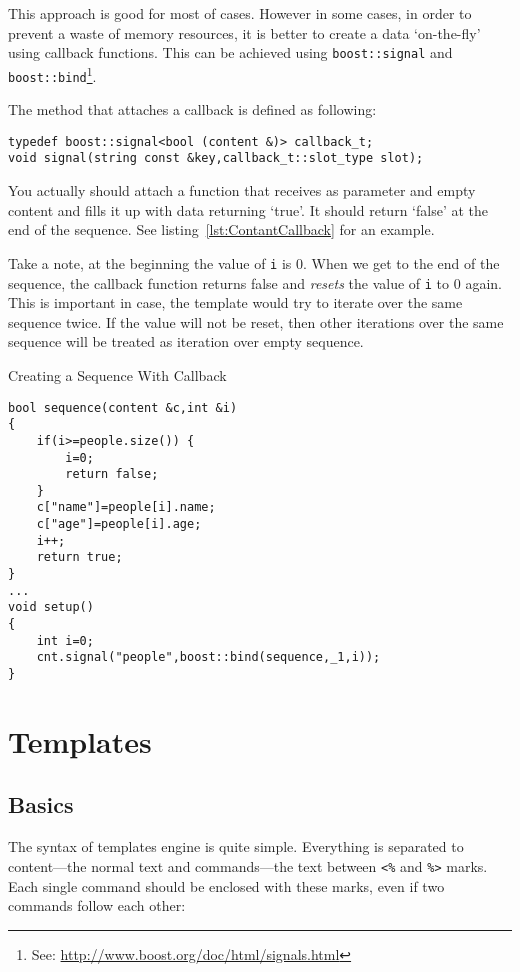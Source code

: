 \documentclass{article}
\newcommand{\tw}[1]{\texttt{#1}}
\begin{document}
This approach is good for most of cases. However in some cases, in order to prevent 
a waste of memory resources, it is better to create
a data `on-the-fly' using callback functions. This can be achieved using
\tw{boost::signal} and \tw{boost::bind}\footnote{See: \url{http://www.boost.org/doc/html/signals.html}}.

The method that attaches a callback is defined as following:

\begin{verbatim}
typedef boost::signal<bool (content &)> callback_t;
void signal(string const &key,callback_t::slot_type slot);
\end{verbatim}

You actually should attach a function that receives as parameter and empty content and fills it up with data returning `true'. It should return `false' at the end of the sequence. See listing~\ref{lst:ContantCallback} for an example.

Take a note, at the beginning the value of \tw{i} is 0. When we get to the end of the sequence, the callback function returns
false and \emph{resets} the value of \tw{i} to 0 again. This is important in case, the template would try to iterate
over the same sequence twice. If the value will not be reset, then other iterations over the same sequence will be
treated as iteration over empty sequence.

\begin{program}
\caption{Creating a Sequence With Callback\label{lst:ContantCallback}}
\begin{verbatim}
bool sequence(content &c,int &i)
{
    if(i>=people.size()) {
        i=0;
        return false;
    }
    c["name"]=people[i].name;
    c["age"]=people[i].age;
    i++;
    return true;
}
...
void setup()
{
    int i=0;
    cnt.signal("people",boost::bind(sequence,_1,i));
}
\end{verbatim}

\end{program}

\section{Templates}

\subsection{Basics}
The syntax of templates engine is quite simple. Everything is separated to content---the normal text and commands---the
text between \verb+<%+ and \verb+%>+ marks. Each single command should be enclosed with these marks, even if two commands follow each other:
\end{document}
